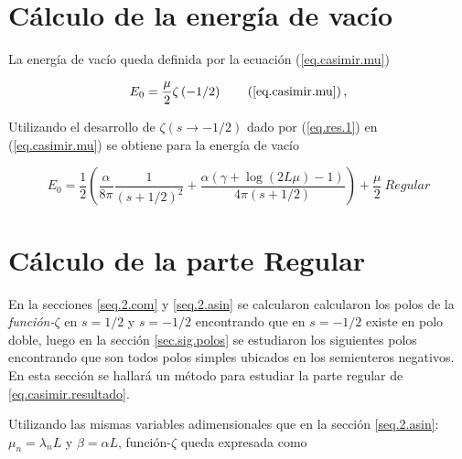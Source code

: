 \begin{comment}
\begin{equation}
\frac{1 }{2 \pi i}
\int _{circulo} \lambda ^{-2s } \partial \lambda \ Ln \left[
					\frac{e ^{\frac{i \alpha  \log ( 2 \lambda L )}{2 \lambda}} e ^{2 i \lambda L} S1}
					{\Gamma \left( 1 - \frac{i \alpha}{2 \lambda} \right)} - 
					\frac{e ^{\frac{-i \alpha  \log (2 \lambda L )}{2 \lambda}} S2}
					{\Gamma \left( 1 + \frac{i \alpha}{2 \lambda} \right)}					
					\right] d \lambda
\end{equation}
\end{comment}


\section{Cálculo de la energía de vacío}

La energía de vacío queda definida por la ecuación (\ref{eq.casimir.mu})

\begin{equation}
    E _0 = \frac{\mu }{2}  
    \zeta  \left( - 1/2 \right) 
    \tag{\ref{eq.casimir.mu}} \, ,
\end{equation}

Utilizando el desarrollo de $\zeta  (s \rightarrow -1/2)$ dado por (\ref{eq.res.1}) en (\ref{eq.casimir.mu}) se obtiene para la energía de vacío

\begin{equation}\label{eq.casimir.resultado}
E _0 = \frac{1}{2} \left(
				\frac{\alpha}{8 \pi  } \frac{1}{(s+1/2)^2} + 
				\frac{\alpha ( \gamma  +  \log (2L \mu ) -1 )}{4 \pi  (s+1/2)}
				\right) + 
				\frac{\mu}{2} \ Regular
\end{equation}

\section{Cálculo de la parte Regular}

En la secciones \ref{seq.2.com} y \ref{seq.2.asin} se calcularon calcularon los polos de la \mbox{{\it función-$\zeta$}} en $s=1/2$ y $s=-1/2$ encontrando que en $s=-1/2$ existe en polo doble, luego en la sección \ref{sec.sig.polos} se estudiaron los siguientes polos encontrando que son todos polos simples ubicados en los semienteros negativos. En esta sección se hallará un método para estudiar la parte regular de \ref{eq.casimir.resultado}.

Utilizando las mismas variables adimensionales que en la sección \ref{seq.2.asin}: $\mu _n = \lambda _n L$ y $\beta = \alpha L$, función-$\zeta$ queda expresada como

